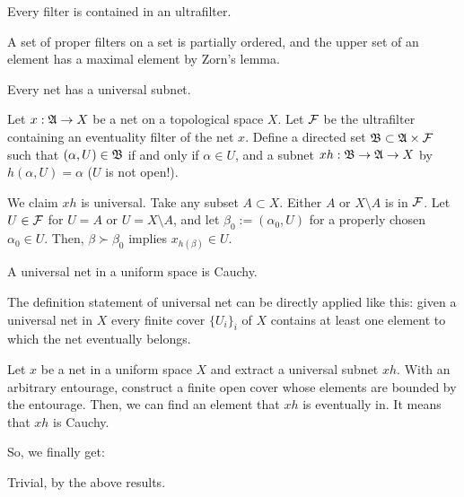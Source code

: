 \documentclass{../exp}
\begin{document}
\begin{thm}
Every filter is contained in an ultrafilter.
\end{thm}
\begin{pf}
A set of proper filters on a set is partially ordered, and the upper set of an element has a maximal element by Zorn's lemma.
\end{pf}

\begin{thm}
Every net has a universal subnet.
\end{thm}
\begin{pf}
Let $x:\fA\to X$ be a net on a topological space $X$.
Let $\mathcal{F}$ be the ultrafilter containing an eventuality filter of the net $x$.
Define a directed set $\mathfrak{B}\subset\mathfrak{A}\times\mathcal{F}$ such that $(\alpha,U)\in\mathfrak{B}$ if and only if $\alpha\in U$, and a subnet $xh:\fB\to\fA\to X$ by $h(\alpha,U)=\alpha$ ($U$ is not open!).

We claim $xh$ is universal.
Take any subset $A\subset X$.
Either $A$ or $X\setminus A$ is in $\mathcal{F}$.
Let $U\in\mathcal{F}$ for $U=A$ or $U=X\setminus A$, and let $\beta_0:=(\alpha_0,U)$ for a properly chosen $\alpha_0\in U$.
Then, $\beta\succ\beta_0$ implies $x_{h(\beta)}\in U$.
\end{pf}

\begin{thm}
A universal net in a uniform space is Cauchy.
\end{thm}
\begin{pf}
The definition statement of universal net can be directly applied like this: given a universal net in $X$ every finite cover $\{U_i\}_i$ of $X$ contains at least one element to which the net eventually belongs.

Let $x$ be a net in a uniform space $X$ and extract a universal subnet $xh$.
With an arbitrary entourage, construct a finite open cover whose elements are bounded by the entourage.
Then, we can find an element that $xh$ is eventually in.
It means that $xh$ is Cauchy.
\end{pf}

So, we finally get:
\begin{pf}[3 of Theorem 1.1]
Trivial, by the above results.
\end{pf}
\end{document}
